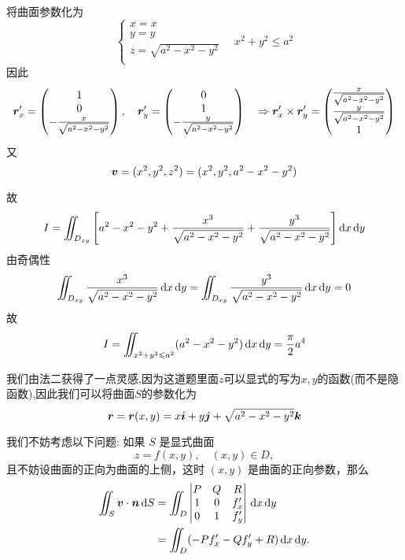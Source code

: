 \begin{solution}
    将曲面参数化为
    $$\begin{cases}
        x = x \\
        y = y \\
        z = \sqrt{a^2 - x^2 - y^2}\\
    \end{cases} \quad x^2 + y^2 \leq a^2$$
    因此$$\bm{r}_x' = \begin{pmatrix}
        1\\
        0\\
        -\frac{x}{\sqrt{a^2 - x^2 - y^2}}\\
        \end{pmatrix}, \quad \bm{r}_y' = \begin{pmatrix}
        0\\
        1\\
        -\frac{y}{\sqrt{a^2 - x^2 - y^2}}\\
        \end{pmatrix} \quad \Rightarrow \bm{r}_x' \times \bm{r}_y' = \begin{pmatrix}
        \frac{x}{\sqrt{a^2 - x^2 - y^2}}\\
        \frac{y}{\sqrt{a^2 - x^2 - y^2}}\\
        1\\
        \end{pmatrix}$$
    又$$\bm{v} = (x^2,y^2,z^2) = (x^2,y^2,a^2 - x^2 - y^2)$$
    
    故$$I = \iint_{D_{xy}} \left[ a^2 - x^2 - y^2 + \frac{x^3}{\sqrt{a^2 - x^2 - y^2}} + \frac{y^3}{\sqrt{a^2 - x^2 - y^2}} \right] \operatorname{d\!} x \operatorname{d\!} y$$
    由奇偶性$$\iint_{D_{xy}} \frac{x^3}{\sqrt{a^2 - x^2 - y^2}} \operatorname{d\!} x \operatorname{d\!} y = \iint_{D_{xy}} \frac{y^3}{\sqrt{a^2 - x^2 - y^2}} \operatorname{d\!} x \operatorname{d\!} y = 0$$
    故
    $$I = \iint_{x^2 + y^2 \leqslant a^2} (a^2 - x^2 - y^2) \operatorname{d\!} x \operatorname{d\!} y = \frac{\pi}{2} a^4$$
\end{solution}

我们由法二获得了一点灵感,因为这道题里面$z$可以显式的写为$x,y$的函数(而不是隐函数),因此我们可以将曲面$S$的参数化为
$$\bm{r} = \bm{r}(x,y) = x \bm{i} + y \bm{j} + \sqrt{a^2 - x^2 - y^2} \bm{k}$$

我们不妨考虑以下问题:
如果 $S$ 是显式曲面
\[
z = f(x, y), \quad (x, y) \in D,
\]
且不妨设曲面的正向为曲面的上侧，这时 $(x, y)$ 是曲面的正向参数，那么
\begin{align*}
    \iint_S \bm{v} \cdot \bm{n} \,\mathrm{d}S 
    &= \iint_D 
    \begin{vmatrix}
        P & Q & R \\
        1 & 0 & f_x' \\
        0 & 1 & f_y'
    \end{vmatrix} 
    \,\mathrm{d}x\,\mathrm{d}y \\
    &= \iint_D (-P f_x' - Q f_y' + R) \,\mathrm{d}x\,\mathrm{d}y.
\end{align*}

